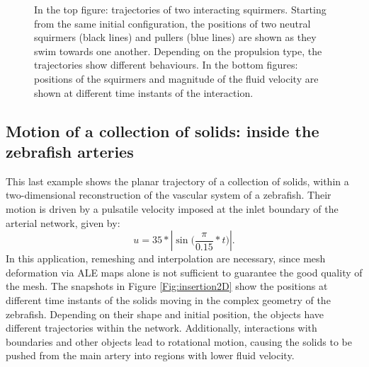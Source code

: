 \documentclass[graybox]{svmult}
\begin{document}
\begin{figure}
	\caption{In the top figure: trajectories of two interacting squirmers. Starting from the same initial configuration, the positions of two neutral squirmers (black lines) and pullers (blue lines) are shown as they swim towards one another. Depending on the propulsion type, the trajectories show different behaviours.
 In the bottom figures: positions of the squirmers and magnitude of the fluid velocity are shown at different time instants of the interaction.}
	\label{Fig:squirmers}
\end{figure}


\subsection{Motion of a collection of solids: inside the zebrafish arteries}

This last example shows the planar trajectory of a collection of solids, within a two-dimensional reconstruction of the vascular system of a zebrafish.
Their motion is driven by a pulsatile velocity imposed at the inlet boundary of the arterial network, given by:  
$$
u = 35 * |\sin \bigl( \frac{\pi}{0.15}*t \bigr) |.
$$ 
In this application, remeshing and interpolation are necessary, since mesh deformation via ALE maps alone is not sufficient to guarantee the good quality of the mesh.
The snapshots in Figure \ref{Fig:insertion2D} show the positions at different time instants of the solids moving in the complex geometry of the zebrafish. Depending on their shape and initial position, the objects have different trajectories within the network. Additionally, interactions with boundaries and other objects lead to rotational motion, causing the solids to be pushed from the main artery into regions with lower fluid velocity.



\end{document}
